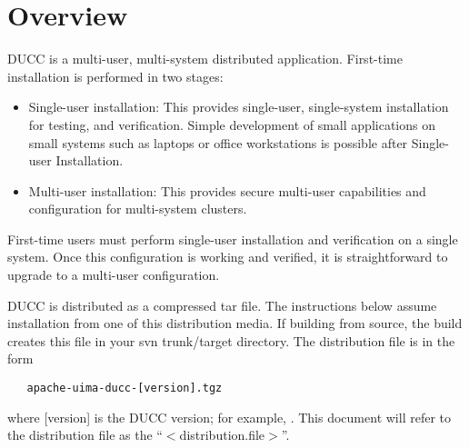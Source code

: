% 
% 
% 
% 
\section{Overview}

DUCC is a multi-user, multi-system distributed application.  First-time installation is performed in
two stages:

\begin{itemize}
    \item Single-user installation: This provides single-user, single-system installation for testing,
      and verification. Simple development of small applications on small systems such as laptops or
      office workstations is possible after Single-user Installation.
      
    \item Multi-user installation: This provides secure multi-user capabilities and configuration
      for multi-system clusters.
\end{itemize}

First-time users must perform single-user installation and verification on a single system.  Once
this configuration is working and verified, it is straightforward to upgrade to a multi-user
configuration.

DUCC is distributed as a compressed tar file.  The instructions below assume installation from one
of this distribution media.  If building from source, the build creates this file in your svn
trunk/target directory. The distribution file is in the form
\begin{verbatim}
   apache-uima-ducc-[version].tgz
\end{verbatim}
where [version] is the DUCC version; for example, {\em \distro}.  This document will refer to the distribution
file as the ``$<$distribution.file$>$''.


